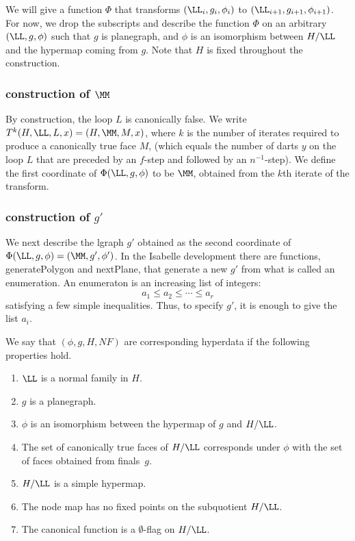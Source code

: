 We will give a function $\Phi$ that transforms $(\LL_i,g_i,\phi_i)$ to
$(\LL_{i+1},g_{i+1},\phi_{i+1})$.  For now, we drop the subscripts and
describe the function $\Phi$ on an arbitrary $(\LL,g,\phi)$ such that
$g$ is planegraph, and $\phi$ is an isomorphism between $H/\LL$ and
the hypermap coming from $g$.  Note that $H$ is fixed throughout the
construction.

\subsubsection{construction of $\MM$}

By construction, the loop $L$ is canonically false.
We write $T^k(H,\LL,L,x) = (H,\MM,M,x)$, where $k$ is
the number of iterates required to produce a canonically
true face $M$, (which equals the number of darts $y$ 
on the loop $L$
that are preceded by an $f$-step and followed by an $n^{-1}$-step).
We define the first coordinate of $\Phi(\LL,g,\phi)$ to be $\MM$,
obtained from the $k$th iterate of the transform.

\subsubsection{construction of $g'$}

We next describe the lgraph $g'$ obtained as the second
coordinate of $\Phi(\LL,g,\phi) = (\MM,g',\phi')$.  
In the Isabelle development there are functions, generatePolygon
and nextPlane, that generate a new $g'$ from what is called
an enumeration.  An enumeraton is an increasing list of integers:
\[
a_1\le a_2\le\cdots \le a_r
\]
satisfying a few simple inequalities.   
Thus, to specify $g'$, it is enough to give the list $a_i$.

We say that $(\phi,g,H,NF)$ are corresponding hyperdata if
the following properties hold.
\begin{enumerate}
\item $\LL$ is a normal family in $H$.
\item $g$ is a planegraph.
\item $\phi$ is an isomorphism between the hypermap of $g$  and
$H/\LL$.  
\item  The set of canonically true faces of $H/\LL$
corresponds under $\phi$ with the set of faces obtained from 
finals~$g$.  
\item  $H/\LL$ is a simple hypermap.
\item The node map has no fixed points on the subquotient $H/\LL$.
\item The canonical function is a $\emptyset$-flag on $H/\LL$.
\end{enumerate}

